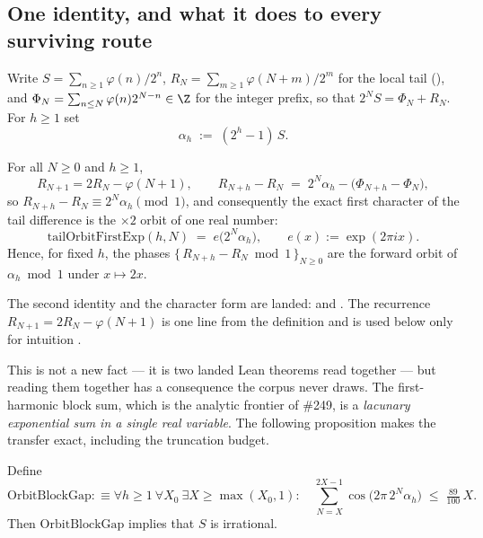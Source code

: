 \subsection{One identity, and what it does to every surviving route}

Write $S=\sum_{n\ge 1}\varphi(n)/2^n$, $R_N=\sum_{m\ge 1}\varphi(N+m)/2^m$
for the local tail
(),
and $\Phi_N=\sum_{n\le N}\varphi(n)2^{N-n}\in\Z$ for the integer prefix, so
that $2^N S=\Phi_N+R_N$. For $h\ge 1$ set
\[
  \alpha_h \;:=\; (2^h-1)\,S .
\]

\begin{lem}\label{lem:orbit}
For all $N\ge 0$ and $h\ge 1$,
\[
  R_{N+1}=2R_N-\varphi(N+1),
  \qquad
  R_{N+h}-R_N \;=\; 2^N\alpha_h-\bigl(\Phi_{N+h}-\Phi_N\bigr),
\]
so $R_{N+h}-R_N \equiv 2^N\alpha_h \pmod 1$, and consequently the exact
first character of the tail difference is the $\times 2$ orbit of one real
number:
\[
  \mathrm{tailOrbitFirstExp}(h,N)
  \;=\; e\bigl(2^N\alpha_h\bigr),
  \qquad e(x):=\exp(2\pi i x).
\]
Hence, for fixed $h$, the phases $\{\,R_{N+h}-R_N \bmod 1\,\}_{N\ge 0}$ are
the forward orbit of $\alpha_h \bmod 1$ under $x\mapsto 2x$.
\end{lem}

\noindent
The second identity and the character form are landed:
and
\quad {} \quad {} \quad {}.
The recurrence $R_{N+1}=2R_N-\varphi(N+1)$ is one line from the definition
and is used below only for intuition .

This is not a new fact --- it is two landed Lean theorems read together ---
but reading them together has a consequence the corpus never draws. The
first-harmonic block sum, which is the analytic frontier of \#249, is a
\emph{lacunary exponential sum in a single real variable}. The following
proposition makes the transfer exact, including the truncation budget.

\begin{prop}\label{prop:transfer}
Define
\[
  \mathrm{OrbitBlockGap} :\equiv
  \forall h\ge 1\ \forall X_0\ \exists X\ge \max(X_0,1):\quad
  \sum_{N=X}^{2X-1}\cos\bigl(2\pi\,2^{N}\alpha_h\bigr)\;\le\;\tfrac{89}{100}\,X .
\]
Then $\mathrm{OrbitBlockGap}$ implies that $S$ is irrational.
\end{prop}

